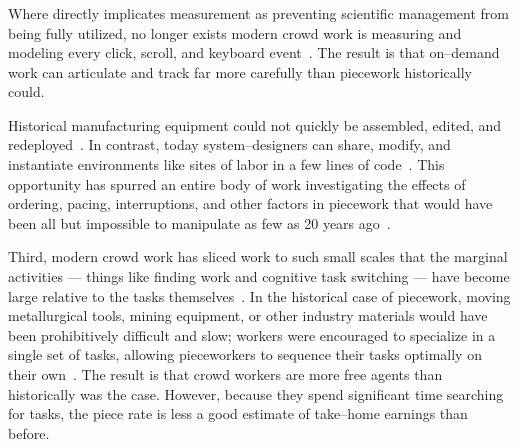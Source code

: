 \documentclass[trackingWork]{subfiles}
\begin{document}
\onlyinsubfile{\newpage}
\subsubsection{\whatchanged}
\begin{comment}
outline
	- measurement is more precise,
  so decomposition is deeper
	- not a single position,
  but a marketplace
\end{comment}

Where \citeauthor{10.2307/23702539} directly implicates measurement as
preventing scientific management from being fully utilized,
no longer exists
modern crowd work is measuring and modeling every click,
scroll,
and keyboard event~\cite{rzeszotarski2011instrumenting,rzeszotarski2012crowdscape}.
The result is that on--demand work can articulate and track far more carefully than piecework historically could.

Historical manufacturing equipment could not quickly be assembled,
edited,
and redeployed~\cite{hu1961parallel}.
In contrast,
today system--designers can share,
modify,
and instantiate environments
like sites of labor in a few lines of code~\cite{lessig2006code,turkitLittle}.
This opportunity has spurred an entire body of work investigating the effects of
ordering,
pacing,
interruptions,
and
other factors in piecework that would have been
all but impossible to manipulate as few as 20 years ago~\cite{dai2015and,Cai:2016:CRI:2858036.2858237,cheng2015break,measuringCrowdsourcingCheng,embracingErrorKrishna}.
 
Third,
modern crowd work has sliced work to such small scales that the marginal activities
--- things like finding work and cognitive task switching ---
have become large relative to the tasks themselves~\cite{taskSearch}.
In the historical case of piecework,
moving metallurgical tools,
mining equipment,
or
other industry materials would have been prohibitively difficult and slow;
workers were encouraged to specialize in a single set of tasks,
allowing pieceworkers to sequence their tasks optimally on their own~\cite{hart2013rise}.
The result is that crowd workers are more free agents than historically was the case.
However,
because they spend significant time searching for tasks,
the piece rate is less a good estimate of take--home earnings than before.
\end{document}
